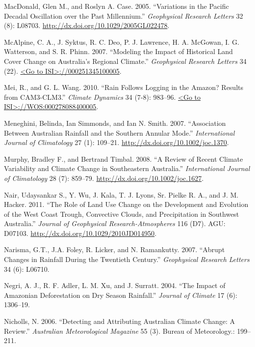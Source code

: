 \documentclass[fleqn,10pt,lineno]{wlpeerj} %
\begin{document}
\hypertarget{ref-MacDonald2005}{}
MacDonald, Glen M., and Roslyn A. Case. 2005. ``Variations in the
Pacific Decadal Oscillation over the Past Millennium.''
\emph{Geophysical Research Letters} 32 (8): L08703.
\url{http://dx.doi.org/10.1029/2005GL022478}.

\hypertarget{ref-McAlpine2007}{}
McAlpine, C. A., J. Syktus, R. C. Deo, P. J. Lawrence, H. A. McGowan, I.
G. Watterson, and S. R. Phinn. 2007. ``Modeling the Impact of Historical
Land Cover Change on Australia's Regional Climate.'' \emph{Geophysical
Research Letters} 34 (22).
\href{\%3CGo\%20to\%20ISI\%3E://000251345100005}{\textless{}Go to ISI\textgreater{}://000251345100005}.

\hypertarget{ref-Mei2010}{}
Mei, R., and G. L. Wang. 2010. ``Rain Follows Logging in the Amazon?
Results from CAM3-CLM3.'' \emph{Climate Dynamics} 34 (7-8): 983--96.
\href{\%3CGo\%20to\%20ISI\%3E://WOS:000278088400005}{\textless{}Go to ISI\textgreater{}://WOS:000278088400005}.

\hypertarget{ref-Meneghini2007}{}
Meneghini, Belinda, Ian Simmonds, and Ian N. Smith. 2007. ``Association
Between Australian Rainfall and the Southern Annular Mode.''
\emph{International Journal of Climatology} 27 (1): 109--21.
\url{http://dx.doi.org/10.1002/joc.1370}.

\hypertarget{ref-Murphy2008}{}
Murphy, Bradley F., and Bertrand Timbal. 2008. ``A Review of Recent
Climate Variability and Climate Change in Southeastern Australia.''
\emph{International Journal of Climatology} 28 (7): 859--79.
\url{http://dx.doi.org/10.1002/joc.1627}.

\hypertarget{ref-Nair2011}{}
Nair, Udaysankar S., Y. Wu, J. Kala, T. J. Lyons, Sr. Pielke R. A., and
J. M. Hacker. 2011. ``The Role of Land Use Change on the Development and
Evolution of the West Coast Trough, Convective Clouds, and Precipitation
in Southwest Australia.'' \emph{Journal of Geophysical
Research-Atmospheres} 116 (D7). AGU: D07103.
\url{http://dx.doi.org/10.1029/2010JD014950}.

\hypertarget{ref-Narisma2007}{}
Narisma, G.T., J.A. Foley, R. Licker, and N. Ramankutty. 2007. ``Abrupt
Changes in Rainfall During the Twentieth Century.'' \emph{Geophysical
Research Letters} 34 (6): L06710.

\hypertarget{ref-Negri2004}{}
Negri, A. J., R. F. Adler, L. M. Xu, and J. Surratt. 2004. ``The Impact
of Amazonian Deforestation on Dry Season Rainfall.'' \emph{Journal of
Climate} 17 (6): 1306--19.

\hypertarget{ref-Nicholls2006}{}
Nicholls, N. 2006. ``Detecting and Attributing Australian Climate
Change: A Review.'' \emph{Australian Meteorological Magazine} 55 (3).
Bureau of Meteorology.: 199--211.
\end{document}
